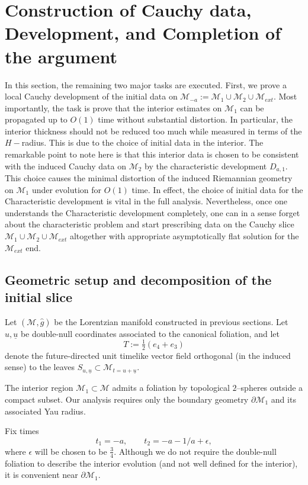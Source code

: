 \documentclass{amsart}
\newcommand{\ubar}{\underline{u}}
\begin{document}
{\section{Construction of Cauchy data, Development, and Completion of the argument}
\label{decomp}
\noindent In this section, the remaining two major tasks are executed. First, we prove a local Cauchy development of the initial data on $\mathcal{M}_{-a}:=\mathcal{M}_{1}\cup \mathcal{M}_{2}\cup \mathcal{M}_{ext}$. Most importantly, the task is prove that the interior estimates on $\mathcal{M}_{1}$ can be propagated up to $O(1)$ time without substantial distortion. In particular, the interior thickness should not be reduced too much while measured in terms of the $H-$radius. This is due to the choice of initial data in the interior. The remarkable point to note here is that this interior data is chosen to be consistent with the induced Cauchy data on $\mathcal{M}_{2}$ by the characteristic development $D_{a,1}$. This choice causes the minimal distortion of the induced Riemannian geometry on $\mathcal{M}_{1}$ under evolution for $O(1)$ time. In effect, the choice of initial data for the Characteristic development is vital in the full analysis. Nevertheless, once one understands the Characteristic development completely, one can in a sense forget about the characteristic problem and start prescribing data on the Cauchy slice $\mathcal{M}_{1}\cup \mathcal{M}_{2}\cup\mathcal{M}_{ext}$ altogether with appropriate asymptotically flat solution for the $\mathcal{M}_{ext}$ end.  

\subsection{Geometric setup and decomposition of the initial slice}
\label{CSgluing}

Let $(\mathcal{M},\widehat{g})$ be the Lorentzian manifold constructed in previous sections.  
Let $u,\ubar$ be double-null coordinates associated to the canonical foliation, and let
\[
T := \tfrac12(e_4+e_3)
\]
denote the future-directed unit timelike vector field orthogonal (in the induced sense) to the leaves $S_{u,\ubar}\subset \mathcal{M}_{t=u+\ubar}$.

\noindent The interior region $\mathcal{M}_{1}\subset\mathcal{M}$ admits a foliation by topological $2$--spheres outside a compact subset.  Our analysis requires only the boundary geometry
\(
\partial\mathcal{M}_{1}
\)
and its associated Yau radius.

\noindent Fix times
\[
t_1=-a,\qquad t_2=-a-1/a+\epsilon,
\]
where $\epsilon$ will be chosen to be $\frac{3}{4}$.  
Although we do not require the double-null foliation to describe the interior evolution (and not well defined for the interior), it is convenient near $\partial\mathcal{M}_{1}$.

}
\end{document}
